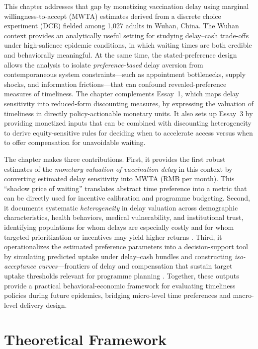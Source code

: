 \documentclass[doublespacing]{utdthesis}
\let\cite=\citep
\begin{document}
This chapter addresses that gap by monetizing vaccination delay using marginal willingness-to-accept (MWTA) estimates derived from a discrete choice experiment (DCE) fielded among 1,027 adults in Wuhan, China. The Wuhan context provides an analytically useful setting for studying delay--cash trade-offs under high-salience epidemic conditions, in which waiting times are both credible and behaviorally meaningful. At the same time, the stated-preference design allows the analysis to isolate \emph{preference-based} delay aversion from contemporaneous system constraints---such as appointment bottlenecks, supply shocks, and information frictions---that can confound revealed-preference measures of timeliness. The chapter complements Essay~1, which maps delay sensitivity into reduced-form discounting measures, by expressing the valuation of timeliness in directly policy-actionable monetary units. It also sets up Essay~3 by providing monetized inputs that can be combined with discounting heterogeneity to derive equity-sensitive rules for deciding when to accelerate access versus when to offer compensation for unavoidable waiting.


The chapter makes three contributions. First, it provides the first robust estimates of the \emph{monetary valuation of vaccination delay} in this context by converting estimated delay sensitivity into MWTA (RMB per month). This ``shadow price of waiting'' translates abstract time preference into a metric that can be directly used for incentive calibration and programme budgeting. Second, it documents systematic \emph{heterogeneity} in delay valuation across demographic characteristics, health behaviors, medical vulnerability, and institutional trust, identifying populations for whom delays are especially costly and for whom targeted prioritization or incentives may yield higher returns \cite{Liu2021}. Third, it operationalizes the estimated preference parameters into a decision-support tool by simulating predicted uptake under delay--cash bundles and constructing \emph{iso-acceptance curves}---frontiers of delay and compensation that sustain target uptake thresholds relevant for programme planning \cite{Abbas2021}. Together, these outputs provide a practical behavioral-economic framework for evaluating timeliness policies during future epidemics, bridging micro-level time preferences and macro-level delivery design.

\section{Theoretical Framework}
\label{subsec:essay2_framework}
\end{document}
